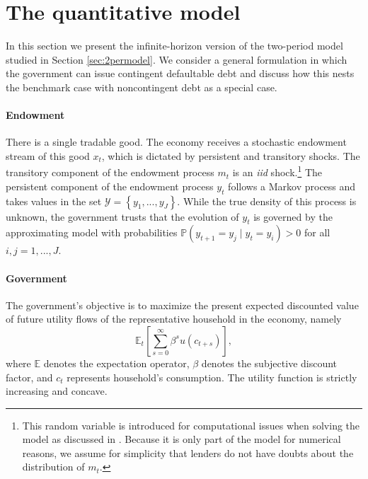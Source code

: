 \section{The quantitative model \label{sec:quantmodel}}

In this section we present the infinite-horizon version of the two-period model studied in Section \ref{sec:2permodel}. We consider a general formulation in which the government can issue contingent defaultable debt and discuss how this nests the benchmark case with noncontingent debt as a special case. %

\paragraph{Endowment} There is a single tradable good. The economy receives a stochastic endowment stream of this good $x_{t}$, which is dictated by persistent and transitory shocks. The transitory component of the endowment process $m_t$ is an \emph{iid} shock.\footnote{This random variable is introduced for computational issues when solving the model as discussed in \cite{Chatty}. Because it is only part of the model for numerical reasons, we assume for simplicity that lenders do not have doubts about the distribution of $m_t$.} The persistent component of the endowment process $y_t$ follows a Markov process and takes values in the set $\mathcal{Y} = \left\{ y_1, ..., y_J \right\}$. While the true density of this process is unknown, the government trusts that the evolution of $y_t$ is governed by the approximating model with probabilities $\mathbb{P}(y_{t+1} = y_j \mid y_{t} = y_i)> 0$ for all $i,j=1,...,J$.  

\paragraph{Government} The government's objective is to maximize the present expected discounted value of future utility flows of the representative household in the economy, namely
\[\mathbb{E}_t \left[ \sum_{s=0}^{\infty} \beta^{s} u\left( c_{t+s} \right)\right],\]
where $\mathbb{E}$ denotes the expectation operator, $\beta$ denotes the subjective discount factor, and $c_t$ represents household's consumption. The utility function is strictly increasing and concave.


